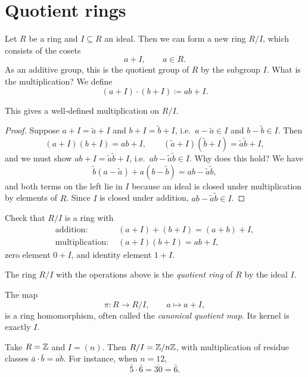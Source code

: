\documentclass[reqno,11pt]{amsart}
\begin{document}
\section{Quotient rings}

Let $R$ be a ring and $I\subseteq R$ an ideal. Then we can form a
new ring $R/I$, which consists of the cosets
\[
  a+I,\qquad a\in R.
\]
As an additive group, this is the quotient group of $R$ by the
subgroup $I$. What is the multiplication? We define
\[
  (a+I)\cdot(b+I)\coloneqq ab+I.
\]

\begin{proposition}\label{prop:well-defined}
This gives a well-defined multiplication on $R/I$.
\end{proposition}
\begin{proof}
Suppose $a+I=\tilde a+I$ and $b+I=\tilde b+I$, i.e.\
$a-\tilde a\in I$ and $b-\tilde b\in I$. Then
\[
  (a+I)(b+I)=ab+I,\qquad(\tilde a+I)(\tilde b+I)=\tilde a\tilde b+I,
\]
and we must show $ab+I=\tilde a\tilde b+I$, i.e.\
$ab-\tilde a\tilde b\in I$. Why does this hold? We have
\[
  \tilde b(a-\tilde a)+a(b-\tilde b)=ab-\tilde a\tilde b,
\]
and both terms on the left lie in $I$ because an ideal is closed under
multiplication by elements of $R$. Since $I$ is closed under addition,
$ab-\tilde a\tilde b\in I$.
\end{proof}

\begin{exercise}
Check that $R/I$ is a ring with
\begin{align*}
  \text{addition: }&(a+I)+(b+I)=(a+b)+I,\\
  \text{multiplication: }&(a+I)(b+I)=ab+I,
\end{align*}
zero element $0+I$, and identity element $1+I$.
\end{exercise}

\begin{define}
The ring $R/I$ with the operations above is the \emph{quotient ring}
of $R$ by the ideal $I$.
\end{define}

The map
\[
  \pi:R\to R/I,\qquad a\mapsto a+I,
\]
is a ring homomorphism, often called the \emph{canonical quotient
map}. Its kernel is exactly $I$.

\begin{example}[{$\Z/n\Z$}]
Take $R=\mathbb{Z}$ and $I=(n)$. Then $R/I=\mathbb{Z}/n\mathbb{Z}$, with multiplication of
residue classes $\bar a\cdot\bar b=\overline{ab}$. For instance, when
$n=12$,
\[
  \bar5\cdot\bar6=\overline{30}=\bar6.
\]
\end{example}
\end{document}
